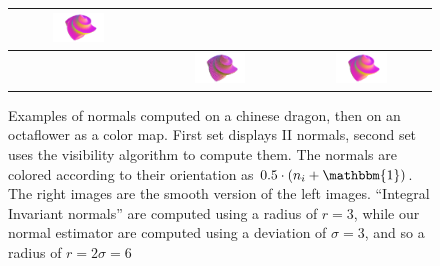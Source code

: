 \documentclass[runningheads]{llncs}
\begin{document}
\begin{figure}
\begin{tabular}{|c||c|c|}
            \includegraphics[width=0.4\textwidth]{pictures/octaflower-normal-estimation-smooth-II} \\
            \hline
            \raisebox{18mm}{Ours} &
            \includegraphics[width=0.4\textwidth]{pictures/octaflower-normal-estimation-cubes-NV} &
            \includegraphics[width=0.4\textwidth]{pictures/octaflower-normal-estimation-smooth-NV} \\
            \hline
        \end{tabular}
        \caption{Examples of normals computed on a chinese dragon, then on an
        octaflower as a color map. First set displays II normals, second set
        uses the visibility algorithm to compute them. The normals are colored
        according to their orientation as $0.5 \cdot (n_i + \mathbbm{1})$. The
        right images are the smooth version of the left images. ``Integral
        Invariant normals'' are computed using a radius of $r=3$, while
        our normal estimator are computed using a deviation of $\sigma=3$, and so
        a radius of $r=2\sigma=6$}
        \label{fig:normals-estimation}
    \end{figure}

\end{document}

